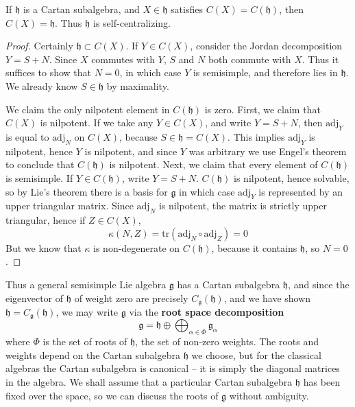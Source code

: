 \begin{theorem}
    If $\mathfrak{h}$ is a Cartan subalgebra, and $X \in \mathfrak{h}$ satisfies $C(X) = C(\mathfrak{h})$, then $C(X) = \mathfrak{h}$. Thus $\mathfrak{h}$ is self-centralizing.
\end{theorem}
\begin{proof}
    Certainly $\mathfrak{h} \subset C(X)$. If $Y \in C(X)$, consider the Jordan decomposition $Y = S + N$. Since $X$ commutes with $Y$, $S$ and $N$ both commute with $X$. Thus it suffices to show that $N = 0$, in which case $Y$ is semisimple, and therefore lies in $\mathfrak{h}$. We already know $S \in \mathfrak{h}$ by maximality.

    We claim the only nilpotent element in $C(\mathfrak{h})$ is zero. First, we claim that $C(X)$ is nilpotent. If we take any $Y \in C(X)$, and write $Y = S + N$, then $\text{adj}_Y$ is equal to $\text{adj}_N$ on $C(X)$, because $S \in \mathfrak{h} = C(X)$. This implies $\text{adj}_Y$ is nilpotent, hence $Y$ is nilpotent, and since $Y$ was arbitrary we use Engel's theorem to conclude that $C(\mathfrak{h})$ is nilpotent. Next, we claim that every element of $C(\mathfrak{h})$ is semisimple. If $Y \in C(\mathfrak{h})$, write $Y = S + N$. $C(\mathfrak{h})$ is nilpotent, hence solvable, so by Lie's theorem there is a basis for $\mathfrak{g}$ in which case $\text{adj}_Y$ is represented by an upper triangular matrix. Since $\text{adj}_N$ is nilpotent, the matrix is strictly upper triangular, hence if $Z \in C(X)$,
    \[ \kappa(N,Z) = \text{tr}(\text{adj}_N \circ \text{adj}_Z) = 0 \]
    But we know that $\kappa$ is non-degenerate on $C(\mathfrak{h})$, because it contains $\mathfrak{h}$, so $N = 0$.
\end{proof}

Thus a general semisimple Lie algebra $\mathfrak{g}$ has a Cartan subalgebra $\mathfrak{h}$, and since the eigenvector of $\mathfrak{h}$ of weight zero are precisely $C_\mathfrak{g}(\mathfrak{h})$, and we have shown $\mathfrak{h} = C_\mathfrak{g}(\mathfrak{h})$, we may write $\mathfrak{g}$ via the {\bf root space decomposition}
%
\[ \mathfrak{g} = \mathfrak{h} \oplus \bigoplus_{\alpha \in \Phi} \mathfrak{g}_\alpha \]
%
where $\Phi$ is the set of roots of $\mathfrak{h}$, the set of non-zero weights. The roots and weights depend on the Cartan subalgebra $\mathfrak{h}$ we choose, but for the classical algebras the Cartan subalgebra is canonical -- it is simply the diagonal matrices in the algebra. We shall assume that a particular Cartan subalgebra $\mathfrak{h}$ has been fixed over the space, so we can discuss the roots of $\mathfrak{g}$ without ambiguity.

